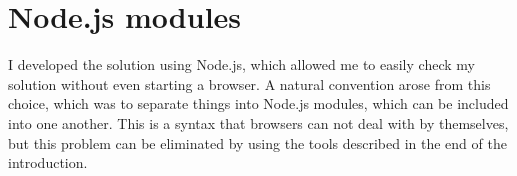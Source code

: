 \section{Node.js modules}
I developed the solution using Node.js, which allowed me to easily check my solution without even starting a browser. A natural convention arose from this choice, which was to separate things into Node.js modules, which can be included into one another. This is a syntax that browsers can not deal with by themselves, but this problem can be eliminated by using the tools described in the end of the introduction.